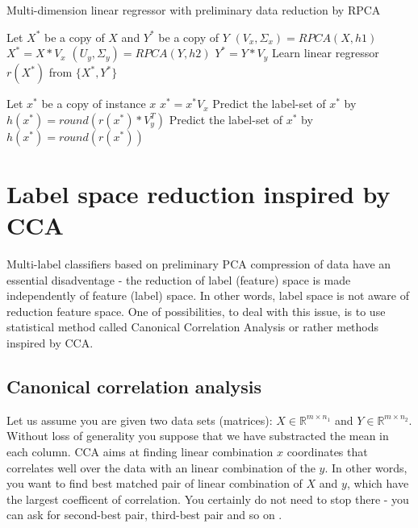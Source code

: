 \begin{algorithm}
    \caption{Multi-dimension linear regressor with preliminary data reduction by RPCA}\label{alg:rpca2}
    \begin{algorithmic}[1]
    \State Let $X^{*}$ be a copy of $X$ and $Y^{*}$ be a copy of $Y$
    \State $(V_{x}, \Sigma_{x}) = RPCA(X,h1)$
        \State $X^{*}=X*V_{x}$
    \EndIf
        \State $(U_{y}, \Sigma_{y}) = RPCA(Y,h2)$
        \State $Y^{*}=Y*V_{y}$
    \EndIf
    \State Learn linear regressor $r(X^*)$ from $\{X^*,Y^*\}$
    \item[]
    \State Let $x^*$ be a copy of instance $x$
        \State $x^* = x^*V_x$
    \EndIf
        \State Predict the label-set of $x^*$ by $h(x^*)=round( r(x^*) * V_y^T)$ 
    \Else
        \State Predict the label-set of $x^*$ by $h(x^*)=round( r(x^*) )$ 
    \EndIf

    \end{algorithmic}
\end{algorithm}


\section{Label space reduction inspired by CCA}

Multi-label classifiers based on preliminary PCA compression of data have an essential disadventage - the reduction of label (feature) space is made independently of feature (label) space. In other words, label space is not aware of reduction feature space. One of possibilities, to deal with this issue, is to use statistical method called Canonical Correlation Analysis or rather methods inspired by CCA.   

\subsection{Canonical correlation analysis}

Let us assume you are given two data sets (matrices): $X \in \mathbb{R}^{m \times n_1}$ and $Y \in \mathbb{R}^{m \times n_2}$. Without loss of generality you suppose that we have substracted the mean in each column. CCA aims at finding linear combination $x$ coordinates that correlates well over the data with an linear combination of the $y$. In other words, you want to find best matched pair of linear combination of $X$ and $y$, which have the largest coefficent of correlation. You certainly do not need to stop there - you can ask for second-best pair, third-best pair and so on \cite{William}.

